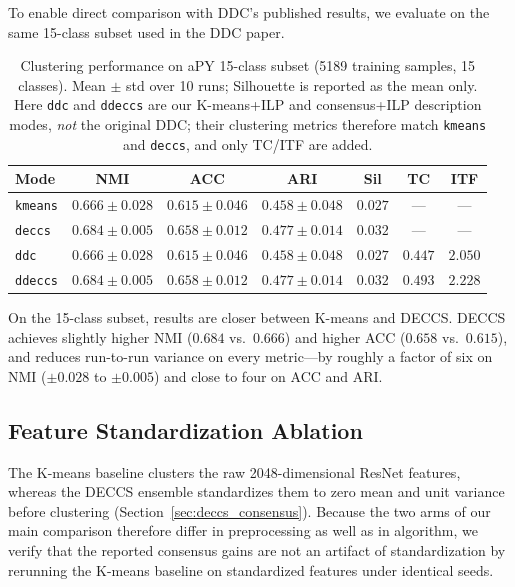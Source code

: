 To enable direct comparison with DDC's published results, we evaluate on the same 15-class subset used in the DDC paper.

\begin{table}[H]
    \centering
    \caption{Clustering performance on aPY 15-class subset (5189 training samples, 15 classes). Mean $\pm$ std over 10 runs; Silhouette is reported as the mean only. Here \texttt{ddc} and \texttt{ddeccs} are our K-means+ILP and consensus+ILP description modes, \emph{not} the original DDC; their clustering metrics therefore match \texttt{kmeans} and \texttt{deccs}, and only TC/ITF are added.}
    \label{tab:apy15_results}
    \begin{tabular}{lcccccc}
        \hline
        \textbf{Mode} & \textbf{NMI} & \textbf{ACC} & \textbf{ARI} & \textbf{Sil} & \textbf{TC} & \textbf{ITF} \\
        \hline
        \texttt{kmeans} & $0.666 \pm 0.028$ & $0.615 \pm 0.046$ & $0.458 \pm 0.048$ & $0.027$ & --- & --- \\
        \texttt{deccs} & $0.684 \pm 0.005$ & $0.658 \pm 0.012$ & $0.477 \pm 0.014$ & $0.032$ & --- & --- \\
        \texttt{ddc} & $0.666 \pm 0.028$ & $0.615 \pm 0.046$ & $0.458 \pm 0.048$ & $0.027$ & $0.447$ & $2.050$ \\
        \texttt{ddeccs} & $0.684 \pm 0.005$ & $0.658 \pm 0.012$ & $0.477 \pm 0.014$ & $0.032$ & $0.493$ & $2.228$ \\
        \hline
    \end{tabular}
\end{table}


On the 15-class subset, results are closer between K-means and DECCS. DECCS achieves slightly higher NMI ($0.684$ vs.\ $0.666$) and higher ACC ($0.658$ vs.\ $0.615$), and reduces run-to-run variance on every metric---by roughly a factor of six on NMI ($\pm 0.028$ to $\pm 0.005$) and close to four on ACC and ARI.


\subsection{Feature Standardization Ablation}
\label{subsec:standardization_ablation}

The K-means baseline clusters the raw 2048-dimensional ResNet features, whereas the
DECCS ensemble standardizes them to zero mean and unit variance before clustering
(Section~\ref{sec:deccs_consensus}). Because the two arms of our main comparison
therefore differ in preprocessing as well as in algorithm, we verify that the
reported consensus gains are not an artifact of standardization by rerunning the
K-means baseline on standardized features under identical seeds.

